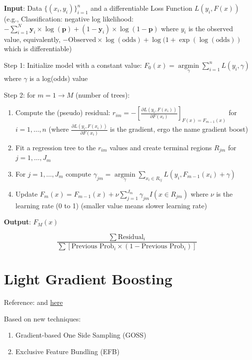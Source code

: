 \documentclass[
]{book}
\providecommand{\tightlist}{%
  \setlength{\itemsep}{0pt}\setlength{\parskip}{0pt}}
\begin{document}
\textbf{Input}: Data \(\{(x_i, y_i)\}^n_{i=1}\) and a differentiable Loss Function \(L(y_i, F(x))\) (e.g., Classification: negative log likelihood: \(- \sum_{i=1}^N \mathbf{y}_i \times\log (\mathbf{p}) + (1- \mathbf{y}_i) \times \log (1 - \mathbf{p})\) where \(y_i\) is the observed value, equivalently, \(- \text{Observed} \times \log(\text{odds}) + \log(1 + \exp(\log(\text{odds}))\) which is differentiable)

Step 1: Initialize model with a constant value: \(F_0(x) = \underset{\gamma}{\operatorname{argmin}} \sum_{i=1}^n L(y_i, \gamma)\) where \(\gamma\) is a log(odds) value

Step 2: for \(m = 1 \to M\) (number of trees):

\begin{enumerate}
\def\labelenumi{\arabic{enumi}.}
\tightlist
\item
  Compute the (pseudo) residual: \(r_{im} = - [ \frac{\partial L( y_i, F(x_i))}{\partial F(x_i)}]_{F(x) = F_{m-1}(x)}\) for \(i = 1, \dots, n\) (where \(\frac{\partial L( y_i, F(x_i))}{\partial F(x_i)}\) is the gradient, ergo the name gradient boost)
\item
  Fit a regression tree to the \(r_{im}\) values and create terminal regions \(R_{jm}\) for \(j = 1, \dots, J_m\)
\item
  For \(j = 1, \dots, J_m\) compute \(\gamma_{jm} = \underset{\gamma}{\operatorname{argmin}} \sum_{x_i \in R_{ij}} L(y_i, F_{m-1}(x_i) + \gamma)\)
\item
  Update \(F_m (x) = F_{m-1}(x) + \nu \sum_{j=1}^{J_m} \gamma_{jm} I(x \in R_{jm})\) where \(\nu\) is the learning rate (0 to 1) (smaller value means slower learning rate)
\end{enumerate}

\textbf{Output}: \(F_M(x)\)

\[
\frac{\sum \text{Residual}_i}{\sum[\text{Previous Prob}_i \times (1 - \text{Previous Prob}_i)]}
\]

\hypertarget{light-gradient-boosting}{%
\section{Light Gradient Boosting}\label{light-gradient-boosting}}

Reference: \citet{machado2019} and \href{https://papers.nips.cc/paper/2017/hash/6449f44a102fde848669bdd9eb6b76fa-Abstract.html}{here}

Based on new techniques:

\begin{enumerate}
\def\labelenumi{\arabic{enumi}.}
\tightlist
\item
  Gradient-based One Side Sampling (GOSS)
\item
  Exclusive Feature Bundling (EFB)
\end{enumerate}
\end{document}
